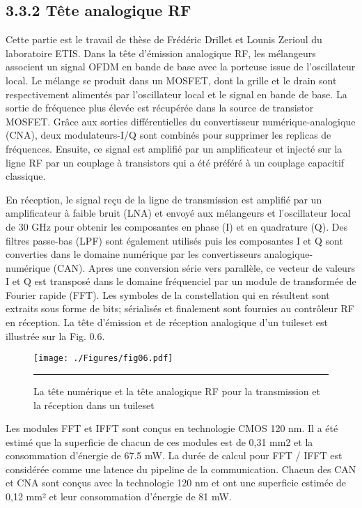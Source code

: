 \subsection*{3.3.2 Tête analogique RF}

Cette partie est le travail de thèse de Frédéric Drillet et Lounis Zerioul du laboratoire ETIS. Dans la tête d’émission analogique RF, les mélangeurs associent un signal OFDM en bande de base avec la porteuse issue de l'oscillateur local. Le mélange se produit dans un MOSFET, dont la grille et le drain sont respectivement alimentés par l'oscillateur local et le signal en bande de base. La sortie de fréquence plus élevée est récupérée dans la source de transistor MOSFET. Grâce aux sorties différentielles du convertisseur numérique-analogique (CNA), deux modulateurs-I/Q sont combinés pour supprimer les replicas de fréquences. Ensuite, ce signal est amplifié par un amplificateur et injecté sur la ligne RF par un couplage à transistors qui a été préféré à un couplage capacitif classique. 

En réception, le signal reçu de la ligne de transmission est amplifié par un amplificateur à faible bruit (LNA) et envoyé aux mélangeurs et l'oscillateur local de 30 GHz pour obtenir les composantes en phase (I) et en quadrature (Q). Des filtres passe-bas (LPF) sont également utilisés puis les composantes I et Q sont converties dans le domaine numérique par les convertisseurs analogique-numérique (CAN). Apres une conversion série vers parallèle, ce vecteur de valeurs I et Q est transposé dans le domaine fréquenciel par un module de transformée de Fourier rapide (FFT). Les symboles de la constellation qui en résultent sont extraits sous forme de bits; sérialisés et finalement sont fournies au contrôleur RF en réception. La tête d’émission et de réception analogique d’un tuileset est illustrée sur la Fig. 0.6. 

\begin{figure}[htbp]
  \centering
    \texttt{[image: ./Figures/fig06.pdf]}
    \rule{35em}{0.5pt}
  \caption[La tête numérique et la tête analogique RF pour la transmission et la réception dans un tuileset]{La tête numérique et la tête analogique RF pour la transmission et la réception dans un tuileset}
  \label{fig:Electron}
\end{figure}

Les modules FFT et IFFT sont conçus en technologie CMOS 120 nm. Il a été estimé que la superficie de chacun de ces modules est de 0,31 mm2 et la consommation d'énergie de 67.5 mW. La durée de calcul pour FFT / IFFT est considérée comme une latence du pipeline de la communication. Chacun des CAN et CNA sont conçus avec la technologie 120 nm et ont une superficie estimée de 0,12 mm² et leur consommation d'énergie de 81 mW. 

